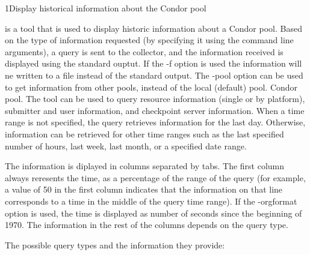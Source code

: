 \begin{ManPage}{}{1}{Display historical information about the Condor pool}
\label{man-condor-stats}
\Synopsis {}


\Description
{} is a tool that is used to display historic information about 
a Condor pool. Based on the type of information requested (by specifying
it using the command line arguments), a query is sent to the collector,
and the information received is displayed using the standard ouptut. If
the -f option is used the information will ne written to a file instead of
the standard output. The -pool option can be used to get information from 
other pools, instead of the local (default) pool.
Condor pool.  The  tool can be used to query resource 
information (single or by platform), submitter and user information, and checkpoint server information.
When a time range is not specified, the query retrieves information for the last
day. Otherwise, information can be retrieved for other time ranges such as the last
specified number of hours, last week, last month, or a specified date range.

The information is diplayed in columns separated by tabs. The first column always reresents
the time, as a percentage of the range of the query (for example, a value of 50 in the first 
column indicates that the information on that line corresponds to a time in the middle of the
query time range). If the -orgformat option is used, the time is displayed as number of seconds
since the beginning of 1970.
The information in the rest of the columns depends on the query type.

The possible query types and the information they provide:


\end{ManPage}
